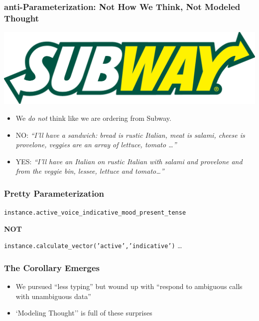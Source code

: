 \documentclass[slidestop,compress,mathserif]{beamer}
\begin{document}
\begin{frame}
	\frametitle{anti-Parameterization:  Not How We Think, Not Modeled Thought}

		\begin{center}
			\includegraphics[scale=0.15]{img/SubwayLogo.png}
		\end{center}			

	\begin{itemize}
		\item We \emph{do not} think like we are ordering from Subway.
		\pause
		\item NO:  \emph{``I'll have a sandwich:  bread is rustic Italian, meat is salami, cheese is provelone, veggies are an array of lettuce, tomato \ldots''}
		\pause
		\item YES:  \emph{``I'll have an Italian on rustic Italian with salami and provelone and from the veggie bin, lessee, lettuce and tomato\ldots''}
	\end{itemize}
	
\end{frame}

\begin{frame}
	\frametitle{Pretty Parameterization}		
	\texttt{instance.active\_voice\_indicative\_mood\_present\_tense}
	\begin{center}
		\textbf{NOT}
	\end{center}
	\texttt{instance.calculate\_vector('active','indicative')} \ldots
\end{frame}


\begin{frame}
	\frametitle{The Corollary Emerges}
	\begin{itemize}
		\item 	We pursued ``less typing'' but wound up with ``respond to ambiguous calls with unambiguous data''
		\pause
		\item 	`Modeling Thought'' is full of these surprises
	\end{itemize}
\end{frame}
\end{document}
